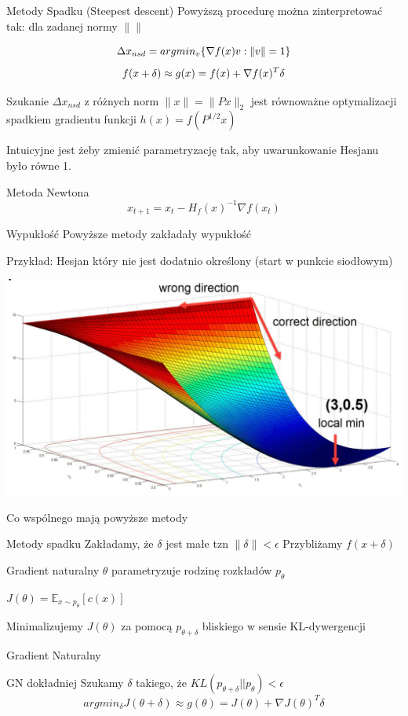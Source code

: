 \documentclass[unknownkeysallowed]{beamer}
\begin{document}
\begin{frame}{Metody Spadku (Steepest descent)}
  Powyższą procedurę można zinterpretować tak: dla zadanej normy $\| \|$

  $$\Delta x_{nsd} = argmin_v \{\nabla f(x) v : \|v\| = 1 \}$$ 
  $$f(x + \delta) \approx g(x) = f(x) + \nabla f(x)^T \delta $$
  
  Szukanie $\Delta x_{nsd}$ z różnych norm $\|x\| = \|Px\|_2$ jest równoważne optymalizacji spadkiem gradientu funkcji $h(x) = f(P^{1/2}x)$ \pause
  

  Intuicyjne jest żeby zmienić parametryzację tak, aby uwarunkowanie Hesjanu było równe 1.
  \begin{block}{Metoda Newtona}
  $$x_{t+1} = x_t - H_f(x)^{-1} \nabla f(x_t)$$
  \end{block}

\end{frame}

\begin{frame}{Wypukłość}
  Powyższe metody zakładały wypukłość 

  Przykład: Hesjan który nie jest dodatnio określony (start w punkcie siodłowym)

 \includegraphics[width=\textwidth]{Niewypukla.jpg} 
\end{frame}

\begin{frame}{Co wspólnego mają powyższe metody}
  \begin{block}{Metody spadku}
  Zakładamy, że $\delta$ jest małe tzn $\| \delta \| < \epsilon$
  Przybliżamy $f(x + \delta)$
  \end{block}

  \begin{block}{Gradient naturalny}
    $\theta$ parametryzuje rodzinę rozkładów $p_{\theta}$

    $J(\theta) = \mathbb{E}_{x \sim p_{\theta}}[c(x)]$

    Minimalizujemy $J(\theta)$ za pomocą $p_{\theta + \delta}$ bliskiego w sensie KL-dywergencji
  \end{block}

\end{frame}


\begin{frame}{Gradient Naturalny}
  \begin{block}{GN dokładniej}
  Szukamy $\delta$ takiego, że $KL(p_{\theta + \delta} || p_{\theta}) < \epsilon$
  $$argmin_{\delta} J(\theta + \delta) \approx g(\theta) = J(\theta) + \nabla J(\theta)^T \delta $$
  \end{block}

  \end{frame}
\end{document}
